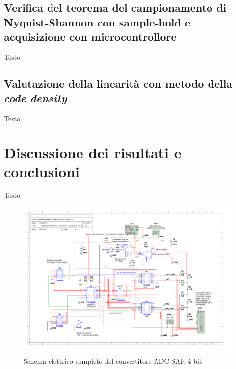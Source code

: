 \documentclass[journal]{IEEEtran}
\begin{document}
\subsection{Verifica del teorema del campionamento di Nyquist-Shannon con sample-hold e acquisizione con microcontrollore}
Testo





\subsection{Valutazione della linearità con metodo della \textit{code density}}
Testo

\section{Discussione dei risultati e conclusioni}
Testo


\begin{figure}[t]%
\centering
\begin{center}
\includegraphics[trim = {0 0 50 0}, width=1.40\textwidth, angle=90]{sch-simulations/digital/output/Schema_convertitore_completo.pdf}
\end{center}
\caption{Schema elettrico completo del convertitore ADC SAR 4 bit}
\label{fig:circuit_sarCompleteSchematic}
\end{figure}



\end{document}
